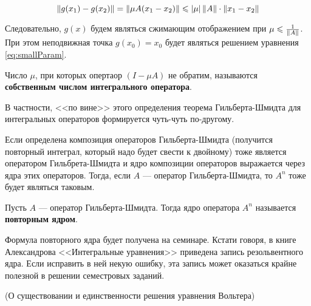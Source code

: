 \documentclass[12pt]{article}
\begin{document}
	$$\left\| g(x_1) - g(x_2) \right\| = \left\| \mu A(x_1 - x_2) \right\| \leqslant \left| \mu \right| \left\| A \right\| \cdot \left\| x_1 - x_2 \right\|$$
	
	Следовательно, $g(x)$ будем являться сжимающим отображением при $\mu \leqslant \frac{1}{\left\| A \right\|}$. При этом
	неподвижная точка $g(x_0) = x_0$ будет являться решением уравнения \ref{eq:smallParam}.
	
	\begin{defi}
		Число $\mu$, при которых опертаор $(I - \mu A)$ не обратим, называются \textbf{собственным числом
		интегрального оператора}.
	\end{defi}
	
	В частности, <<по вине>> этого определения теорема Гильберта-Шмидта для интегральных операторов формируется
	чуть-чуть по-другому.
	
	Если определена композиция операторов Гильберта-Шмидта (получится повторный интеграл, который надо будет 
	свести к двойному) тоже является оператором Гильбрета-Шмидта и ядро композиции операторов выражается 
	через ядра этих операторов. Тогда, если $A$ --- оператор Гильберта-Шмидта, то $A^n$ тоже будет являться
	таковым.
	
	\begin{defi}
		Пусть $A$ --- оператор Гильберта-Шмидта. Тогда ядро оператора $A^n$ называется \textbf{повторным ядром}.
	\end{defi}
	
	{\footnotesize
	Формула повторного ядра будет получена на семинаре. Кстати говоря, в книге Александрова <<Интегральные уравнения>>
	приведена запись резольвентного ядра. Если исправить в ней некую ошибку, эта запись может оказаться крайне полезной
	в решении семестровых заданий.\par
	}
	
	\begin{theorem}
		(О существовании и единственности решения уравнения Вольтера)
	\end{theorem}		
\end{document}
